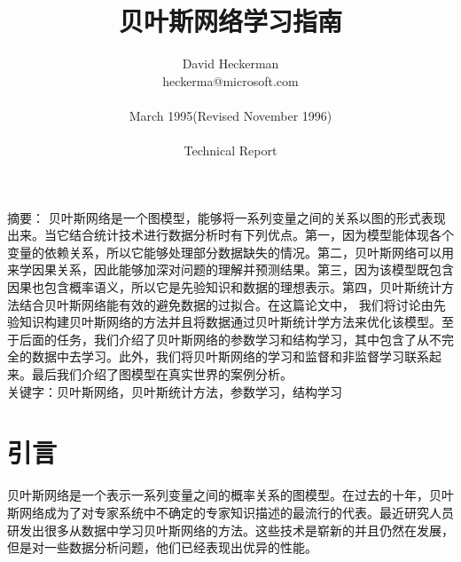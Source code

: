 \documentclass[10pt,a4paper]{article}
\newcommand{\hei}{\CJKfamily{hei}}       						%
\newcommand{\kai}{\CJKfamily{kai}}       						%
\begin{document}
\begin{CJK*}{UTF8}{gkai}
\title{贝叶斯网络学习指南}					   					%
\author{David Heckerman		\\  
        heckerma@microsoft.com \\
        \\
        March 1995(Revised November 1996)\\
        \\
        Technical Report\\
		}
\date{}                                             				%
\maketitle                                          				%
\clearpage
\tableofcontents 												%
\clearpage


\newcommand{\cnabstract}
{
贝叶斯网络是一个图模型，能够将一系列变量之间的关系以图的形式表现出来。当它结合统计技术进行数据分析时有下列优点。第一，因为模型能体现各个变量的依赖关系，所以它能够处理部分数据缺失的情况。第二，贝叶斯网络可以用来学因果关系，因此能够加深对问题的理解并预测结果。第三，因为该模型既包含因果也包含概率语义，所以它是先验知识和数据的理想表示。第四，贝叶斯统计方法结合贝叶斯网络能有效的避免数据的过拟合。在这篇论文中， 我们将讨论由先验知识构建贝叶斯网络的方法并且将数据通过贝叶斯统计学方法来优化该模型。至于后面的任务，我们介绍了贝叶斯网络的参数学习和结构学习，其中包含了从不完全的数据中去学习。此外，我们将贝叶斯网络的学习和监督和非监督学习联系起来。最后我们介绍了图模型在真实世界的案例分析。
}
\newcommand{\cnkeywords}{贝叶斯网络，贝叶斯统计方法，参数学习，结构学习}
\begin{center}
\begin{minipage}[c]{12cm}										%
\hei 摘要：\kai \cnabstract\\
\hei 关键字：\kai \cnkeywords\\
\end{minipage}
\end{center}
\newpage



\section{引言}
贝叶斯网络是一个表示一系列变量之间的概率关系的图模型。在过去的十年，贝叶斯网络成为了对专家系统中不确定的专家知识描述的最流行的代表。最近研究人员研发出很多从数据中学习贝叶斯网络的方法。这些技术是崭新的并且仍然在发展，但是对一些数据分析问题，他们已经表现出优异的性能。



\end{CJK*}
\end{document}

